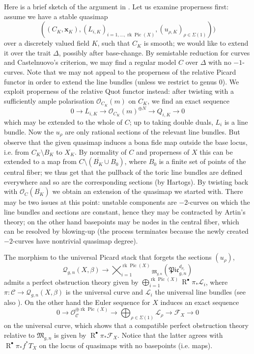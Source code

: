\documentclass[11pt]{amsart}
\newcommand{\Q}[4]{\mathcal{Q}_{#1,#2}(#3,#4)}
\newcommand{\OO}{\mathcal{O}}
\renewcommand{\to}{\rightarrow}
\newcommand{\MM}{\mathfrak M}
\newcommand{\Pic}{\operatorname{Pic}}
\newcommand{\rk}{\operatorname{rk}}
\newcommand{\dvr}{\Delta}
\theoremstyle{definition}
\theoremstyle{definition}
\begin{document}
Here is a brief sketch of the argument in \cite{CF-K}. Let us examine properness first: assume we have a stable quasimap \[((C_K,\mathbf x_K), (L_{i,K})_{i=1,\ldots,\rk\Pic(X)},(u_{\rho,K})_{\rho\in\Sigma(1)}))\] over a discretely valued field $K$, such that $C_K$ is smooth; we would like to extend it over the trait $\dvr$, possibly after base-change. By semistable reduction for curves and Castelnuovo's criterion, we may find a regular model $C$ over $\dvr$ with no $-1$-curves. Note that we may not appeal to the properness of the relative Picard functor in order to extend the line bundles (unless we restrict to genus $0$). We exploit properness of the relative Quot functor instead: after twisting with a sufficiently ample polarisation $\OO_{C_K}(m)$ on $C_K$, we find an exact sequence
\[ 0 \to L_{i,K} \to \OO_{C_K}(m)^{\oplus N} \to Q_{i,K}\to 0 \]
which may be extended to the whole of $C$; up to taking double duals, $L_i$ is a line bundle. Now the $u_\rho$ are only rational sections of the relevant line bundles. But observe that the given quasimap induces a bona fide map outside the base locus, i.e. from $C_K\setminus B_K$ to $X_K$. By normality of $C$ and properness of $X$ this can be extended to a map from $C\setminus(\overline{B_K}\cup B_0)$, where $B_0$ is a finite set of points of the central fiber; we thus get that the pullback of the toric line bundles are defined everywhere and so are the corresponding sections (by Hartogs). By twisting back with $\OO_C(\overline{B_K})$ we obtain an extension of the quasimap we started with. There may be two issues at this point: unstable components are $-2$-curves on which the line bundles and sections are constant, hence they may be contracted by Artin's theory; on the other hand basepoints may be nodes in the central fiber, which can be resolved by blowing-up (the process terminates because the newly created $-2$-curves have nontrivial quasimap degree).

The morphism to the universal Picard stack that forgets the sections $(u_\rho)$,
\[\Q{g}{n}{X}{\beta} \to \bigtimes_{i=1}^{\rk\Pic(X)}{}_{\MM_{g,n}}\left(\mathfrak{Pic}^{d_{\rho_i}}_{g,n}\right)\]
admits a perfect obstruction theory given by $\bigoplus_{i=1}^{\rk\Pic(X)} \operatorname R^\bullet\pi_*\mathcal L_i$, where $\pi\colon \mathcal C\to \Q{g}{n}{X}{\beta}$ is the universal curve and $\mathcal L_i$ the universal line bundles (see also \cite{Jie, CL-pfields}). On the other hand the Euler sequence for $X$ induces an exact sequence
\[ 0\to \OO_{\mathcal C}^{\oplus\rk\Pic(X)}\to \bigoplus_{\rho\in\Sigma(1)}\mathcal L_\rho\to\mathcal F_X\to 0\]
on the universal curve, which shows that a compatible perfect obstruction theory relative to $\MM_{g,n}$ is given by $\operatorname R^\bullet\pi_*\mathcal F_X$. Notice that the latter agrees with $\operatorname R^\bullet\pi_*f^*T_X$ on the locus of quasimaps with no basepoints (i.e. maps).
\end{document}
